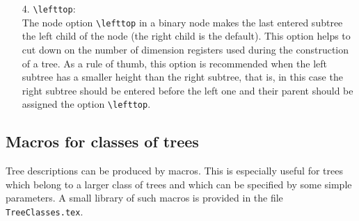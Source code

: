 \begin{enumerate}
\item[4.] \verb.\lefttop.:\\                                                    
     The node option \verb.\lefttop. in a binary node makes the                 
     last entered subtree the left child of the node (the right child is the    
     default). This option helps to cut down on the number of dimension registers  
     used during the construction of a tree. As a rule of thumb,                
     this option is recommended when the left subtree has a smaller             
     height than the right subtree, that is,                                    
     in this case the right subtree should                                      
     be entered before the left one and their parent should be assigned the option 
     \verb.\lefttop..                                                           
\end{enumerate}                                                                 
                                                                                
\subsection{Macros for classes of trees}
\label{ExampleClasses}                                        
                                                                                
Tree descriptions can be produced by macros. This is especially useful          
for trees which belong to a larger class of trees and which can be specified    
by some simple parameters. A small library of such                              
macros is provided in the file \verb!TreeClasses.tex!.                          
                                                                                
